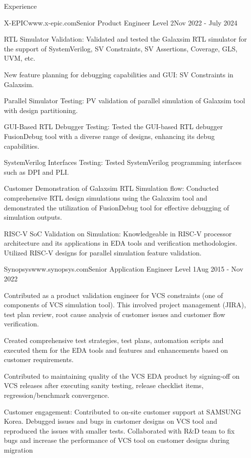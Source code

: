 \documentclass[
11pt, %
]{./assets/resume} %
\begin{document}
\begin{rSection}{Experience}
	\begin{rSubsectionX}{X-EPIC}{www.x-epic.com}{Senior Product Engineer Level 2}{Nov 2022 - July 2024}
		\item RTL Simulator Validation: Validated and tested the Galaxsim RTL simulator for the support of SystemVerilog, SV Constraints, SV Assertions, Coverage, GLS, UVM, etc.
		\item New feature planning for debugging capabilities and GUI: SV Constraints in Galaxsim.
		\item Parallel Simulator Testing: PV validation of parallel simulation of Galaxsim tool with design partitioning.
		\item GUI-Based RTL Debugger Testing: Tested the GUI-based RTL debugger FusionDebug tool with a diverse range of designs, enhancing its debug capabilities.
		\item SystemVerilog Interfaces Testing: Tested SystemVerilog programming interfaces such as DPI and PLI. 
		\item Customer Demonstration of Galaxsim RTL Simulation flow: Conducted comprehensive RTL design simulations using the Galaxsim tool and demonstrated the utilization of FusionDebug tool for effective debugging of simulation outputs.
		\item RISC-V SoC Validation on Simulation: Knowledgeable in RISC-V processor architecture and its applications in EDA tools and verification methodologies. Utilized RISC-V designs for parallel simulation feature validation.
	\end{rSubsectionX}
	\begin{rSubsectionX}{Synopsys}{www.synopsys.com}{Senior Application Engineer Level 1}{Aug 2015 - Nov 2022}
		\item Contributed as a product validation engineer for VCS constraints (one of components of VCS simulation tool). This involved project management (JIRA), test plan review, root cause analysis of customer issues and customer flow verification.
		\item Created comprehensive test strategies, test plans, automation scripts and executed them for the EDA tools and features and enhancements based on customer requirements.
		\item Contributed to maintaining quality of the VCS EDA product by signing-off on VCS releases after executing sanity testing, release checklist items, regression/benchmark convergence.
		\item Customer engagement: Contributed to on-site customer support at SAMSUNG Korea. Debugged issues and bugs in customer designs on VCS tool and reproduced the issues with smaller tests. Collaborated with R\&D team to fix bugs and increase the performance of VCS tool on customer designs during migration

\end{rSubsectionX}
\end{rSection}
\end{document}
